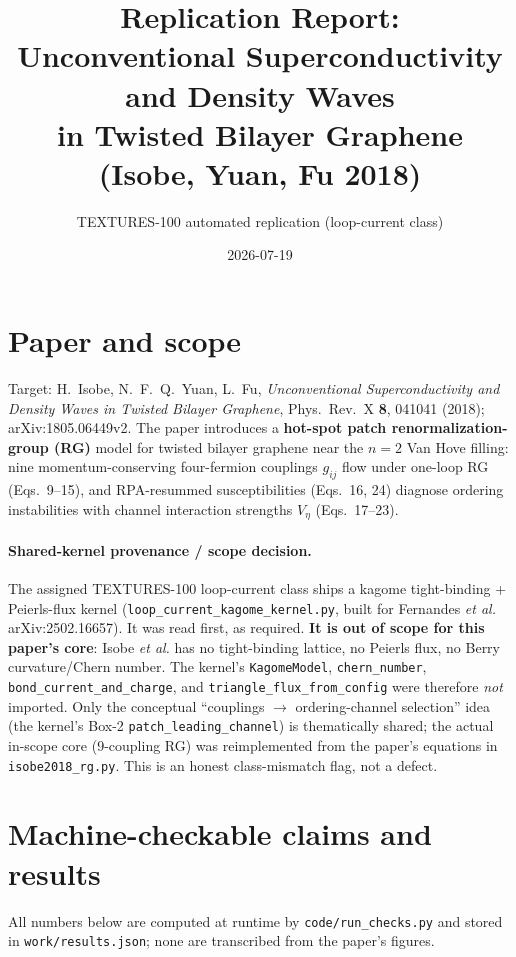 \documentclass[11pt]{article}
\title{Replication Report: \\ Unconventional Superconductivity and Density Waves \\ in Twisted Bilayer Graphene (Isobe, Yuan, Fu 2018)}
\author{TEXTURES-100 automated replication (loop-current class)}
\date{2026-07-19}
\begin{document}
\maketitle

\section{Paper and scope}
Target: H.~Isobe, N.~F.~Q.~Yuan, L.~Fu, \emph{Unconventional Superconductivity
and Density Waves in Twisted Bilayer Graphene}, Phys.\ Rev.\ X \textbf{8}, 041041
(2018); arXiv:1805.06449v2. The paper introduces a \textbf{hot-spot patch
renormalization-group (RG)} model for twisted bilayer graphene near the $n=2$
Van Hove filling: nine momentum-conserving four-fermion couplings $g_{ij}$ flow
under one-loop RG (Eqs.~9--15), and RPA-resummed susceptibilities (Eqs.~16, 24)
diagnose ordering instabilities with channel interaction strengths $V_\eta$
(Eqs.~17--23).

\paragraph{Shared-kernel provenance / scope decision.} The assigned TEXTURES-100
loop-current class ships a kagome tight-binding + Peierls-flux kernel
(\texttt{loop\_current\_kagome\_kernel.py}, built for Fernandes \emph{et al.}
arXiv:2502.16657). It was read first, as required. \textbf{It is out of scope for
this paper's core}: Isobe \emph{et al.} has no tight-binding lattice, no Peierls
flux, no Berry curvature/Chern number. The kernel's \texttt{KagomeModel},
\texttt{chern\_number}, \texttt{bond\_current\_and\_charge}, and
\texttt{triangle\_flux\_from\_config} were therefore \emph{not} imported. Only the
conceptual ``couplings $\rightarrow$ ordering-channel selection'' idea (the
kernel's Box-2 \texttt{patch\_leading\_channel}) is thematically shared; the
actual in-scope core (9-coupling RG) was reimplemented from the paper's equations
in \texttt{isobe2018\_rg.py}. This is an honest class-mismatch flag, not a defect.

\section{Machine-checkable claims and results}
All numbers below are computed at runtime by \texttt{code/run\_checks.py} and
stored in \texttt{work/results.json}; none are transcribed from the paper's
figures.
\end{document}
